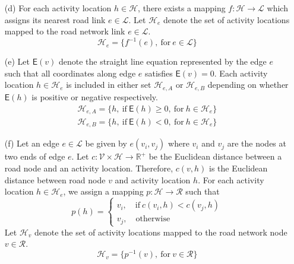 \documentclass[12pt]{article}
\begin{document}
\begin{enumerate}
		\item[(d)] For each activity location $h\in\mathcal{H}$, there exists a mapping $f:\mathcal{H}\rightarrow\mathcal{L}$ which assigns its nearest road link $e\in\mathcal{L}$. Let $\mathcal{H}_e$ denote the set of activity locations mapped to the road network link $e\in\mathcal{L}$.
		\begin{equation}\mathcal{H}_e=\{f^{-1}(e),\ \textrm{for}\ e\in\mathcal{L}\}\end{equation}
		
		\item[(e)] Let $\mathsf{E}(v)$ denote the straight line equation represented by the edge $e$ such that all coordinates along edge $e$ satisfies $\mathsf{E}(v)=0$. Each activity location $h\in\mathcal{H}_e$ is included in either set $\mathcal{H}_{e,A}$ or $\mathcal{H}_{e,B}$ depending on whether $\mathsf{E}(h)$ is positive or negative respectively.
		\begin{equation}
		\begin{aligned}
		\mathcal{H}_{e,A}=\{h,\ \textrm{if}\ \mathsf{E}(h)\geq 0,\ \textrm{for}\ h\in\mathcal{H}_e\}\\
		\mathcal{H}_{e,B}=\{h,\ \textrm{if}\ \mathsf{E}(h)< 0,\ \textrm{for}\ h\in\mathcal{H}_e\}
		\end{aligned}
		\end{equation}
		
		\item[(f)] Let an edge $e\in\mathcal{L}$ be given by $e(v_i,v_j)$ where $v_i$ and $v_j$ are the nodes at two ends of edge $e$. Let $c:\mathcal{V}\times\mathcal{H}\rightarrow\mathbb{R}^{+}$ be the Euclidean distance between a road node and an activity location. Therefore, $c(v,h)$ is the Euclidean distance between road node $v$ and activity location $h$. For each activity location $h\in\mathcal{H}_{e}$, we assign a mapping $p:\mathcal{H}\rightarrow\mathcal{R}$ such that
		\begin{equation}
		p(h)=
		\begin{cases}
		v_i,\quad \textrm{if}\ c(v_i,h)<c(v_j,h)\\
		v_j,\quad \textrm{otherwise}
		\end{cases}
		\end{equation}
		Let $\mathcal{H}_v$ denote the set of activity locations mapped to the road network node $v\in\mathcal{R}$.
		\begin{equation}
		\mathcal{H}_v=\{p^{-1}(v),\ \textrm{for}\ v\in\mathcal{R}\}
		\end{equation}
	\end{enumerate}
	
\end{document}
